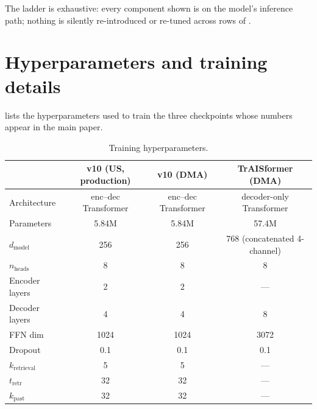 \documentclass[11pt]{article}
\begin{document}
The ladder is exhaustive: every component shown is on the model's
inference path; nothing is silently re-introduced or re-tuned across
rows of .

\section{Hyperparameters and training details}
\label{sec:appendix-hp}

 lists the hyperparameters used to train the three
checkpoints whose numbers appear in the main paper.

\begin{table}[h]
  \centering
  \small
  \caption{Training hyperparameters.}
  \label{tab:hp}
  \begin{tabular}{lccc}
    \toprule
                                & \textbf{v10 (US, production)} & \textbf{v10 (DMA)} & \textbf{TrAISformer (DMA)} \\
    \midrule
    Architecture                & enc--dec Transformer        & enc--dec Transformer        & decoder-only Transformer \\
    Parameters                  & 5.84M                       & 5.84M                       & 57.4M \\
    $d_{\text{model}}$          & 256                         & 256                         & 768 (concatenated 4-channel) \\
    $n_{\text{heads}}$          & 8                           & 8                           & 8 \\
    Encoder layers              & 2                           & 2                           & --- \\
    Decoder layers              & 4                           & 4                           & 8 \\
    FFN dim                     & 1024                        & 1024                        & 3072 \\
    Dropout                     & 0.1                         & 0.1                         & 0.1 \\
    $k_{\text{retrieval}}$      & 5                           & 5                           & --- \\
    $t_{\text{retr}}$           & 32                          & 32                          & --- \\
    $k_{\text{past}}$           & 32                          & 32                          & --- \\

\end{tabular}
\end{table}
\end{document}
